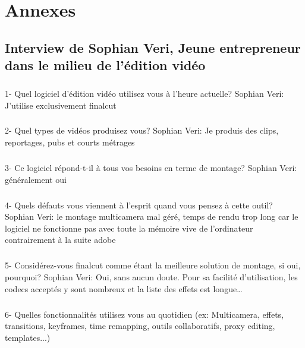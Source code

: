\newpage

\chapter*{Annexes}
\section*{Interview de Sophian Veri,
Jeune entrepreneur dans le milieu de l'édition vidéo}

\paragraph{}
1-  Quel logiciel d'édition vidéo utilisez vous à l'heure actuelle?
Sophian Veri: J'utilise exclusivement finalcut

\paragraph{}
2- Quel types de vidéos produisez vous?
Sophian Veri: Je produis des clips, reportages, pubs et courts métrages

\paragraph{}
3- Ce logiciel répond-t-il à tous vos besoins en terme de montage?
Sophian Veri: généralement oui

\paragraph{}
4- Quels défauts vous viennent à l'esprit quand vous pensez à cette outil?
Sophian Veri: le montage multicamera mal géré, temps de rendu trop long car le
logiciel ne fonctionne pas avec toute la mémoire vive de l'ordinateur
contrairement à la suite adobe

\paragraph{}
5- Considérez-vous finalcut comme étant la meilleure solution de montage,
si oui, pourquoi?
Sophian Veri: Oui, sans aucun doute. Pour sa facilité d'utilisation,
les codecs acceptés y sont nombreux et la liste des effets est
longue\ldots

\paragraph{}
6-  Quelles fonctionnalités utilisez vous au quotidien (ex: Multicamera, effets,
transitions, keyframes, time remapping, outils collaboratifs, proxy
editing, templates...)

